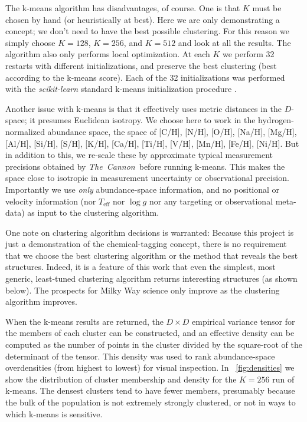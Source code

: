 \documentclass[12pt, letterpaper, preprint]{aastex}
\newcommand{\project}[1]{\textsl{#1}}
\newcommand{\thecannon}{\project{The~Cannon}}
\newcommand{\teff}{T_{\mathrm{eff}}}
\newcommand{\logg}{\log g}
\begin{document}
The k-means algorithm has disadvantages, of course.
One is that $K$ must be chosen by hand (or heuristically at best).
Here we are only demonstrating a concept; we don't need to have the
best possible clustering.
For this reason we simply choose $K=128$, $K=256$, and $K=512$ and look at all the
results.
The algorithm also only performs local optimization.
At each $K$ we perform 32 restarts with different initializations, and
preserve the best clustering (best according to the k-means score).
Each of the 32 initializations was performed with the
\project{scikit-learn} standard k-means initialization procedure
\citep{sklearn}.

Another issue with k-means is that it effectively uses metric
distances in the $D$-space; it presumes Euclidean isotropy.
We choose here to work in the hydrogen-normalized abundance space, the
space of [C/H], [N/H], [O/H], [Na/H], [Mg/H], [Al/H], [Si/H], [S/H],
[K/H], [Ca/H], [Ti/H], [V/H], [Mn/H], [Fe/H], [Ni/H].
But in addition to this, we re-scale these by approximate typical measurement
precisions obtained by \thecannon\ before running k-means.
This makes the space close to isotropic in measurement uncertainty or
observational precision.
Importantly we use \emph{only} abundance-space information, and no
positional or velocity information (nor $\teff$ nor $\logg$ nor any
targeting or observational meta-data) as input to the clustering
algorithm.

One note on clustering algorithm decisions is warranted:
Because this project is just a demonstration of the chemical-tagging
concept, there is no requirement that we choose the best clustering
algorithm or the method that reveals the best structures.
Indeed, it is a feature of this work that even the simplest, most
generic, least-tuned clustering algorithm returns interesting
structures (as shown below).
The prospects for Milky Way science only improve as the clustering
algorithm improves.

When the k-means results are returned, the $D\times D$ empirical
variance tensor for the members of each cluster can be constructed,
and an effective density can be computed as the number of points in
the cluster divided by the square-root of the determinant of the
tensor.
This density was used to rank abundance-space overdensities (from highest
to lowest) for visual inspection.
In \figurename~\ref{fig:densities} we show the distribution of cluster membership
and density for the $K=256$ run of k-means.
The densest clusters tend to have fewer members, presumably because
the bulk of the population is not extremely strongly clustered, or not
in ways to which k-means is sensitive.
\end{document}
